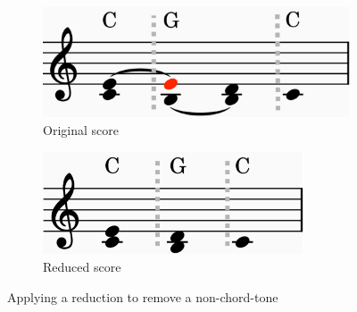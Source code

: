 \documentclass[12pt,a4paper,twoside,openright]{report} \usepackage[pdfborder={0 0 0}]{hyperref}    %
\theoremstyle{definition} \newtheorem{definition}{Definition}[section]
\begin{document}
\begin{itemize}
  \begin{figure}[h] \centering \begin{subfigure}[t]{.4\textwidth}
    \centering\includegraphics[keepaspectratio,width=\textwidth]{prep/harm/unreducedScore.png} \caption{Original score}
    \label{fig:pvHarmonyUnreducedInner} \end{subfigure} \begin{subfigure}[t]{.44\textwidth}
    \centering\includegraphics[keepaspectratio,width=0.85\textwidth]{prep/harm/reducedScore.png} \caption{Reduced score}
  \label{fig:pvHarmonyReducedInner} \end{subfigure}
\captionsetup{width=.9\linewidth} \caption{Applying a reduction to remove a non-chord-tone} \label{fig:pvHarmony}
\end{figure}


\end{itemize}
\end{document}
